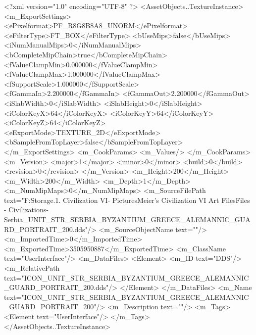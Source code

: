 <?xml version="1.0" encoding="UTF-8" ?>
<AssetObjects..TextureInstance>
	<m_ExportSettings>
		<ePixelformat>PF_R8G8B8A8_UNORM</ePixelformat>
		<eFilterType>FT_BOX</eFilterType>
		<bUseMips>false</bUseMips>
		<iNumManualMips>0</iNumManualMips>
		<bCompleteMipChain>true</bCompleteMipChain>
		<fValueClampMin>0.000000</fValueClampMin>
		<fValueClampMax>1.000000</fValueClampMax>
		<fSupportScale>1.000000</fSupportScale>
		<fGammaIn>2.200000</fGammaIn>
		<fGammaOut>2.200000</fGammaOut>
		<iSlabWidth>0</iSlabWidth>
		<iSlabHeight>0</iSlabHeight>
		<iColorKeyX>64</iColorKeyX>
		<iColorKeyY>64</iColorKeyY>
		<iColorKeyZ>64</iColorKeyZ>
		<eExportMode>TEXTURE_2D</eExportMode>
		<bSampleFromTopLayer>false</bSampleFromTopLayer>
	</m_ExportSettings>
	<m_CookParams>
		<m_Values/>
	</m_CookParams>
	<m_Version>
		<major>1</major>
		<minor>0</minor>
		<build>0</build>
		<revision>0</revision>
	</m_Version>
	<m_Height>200</m_Height>
	<m_Width>200</m_Width>
	<m_Depth>1</m_Depth>
	<m_NumMipMaps>0</m_NumMipMaps>
	<m_SourceFilePath text="F:\Mod Storage\2.1. Civilization VI\Mods\Archive - Pictures\Sid Meier's Civilization VI Art Files\Art Files - Civilizations\Civilization - Serbia\ICON_UNIT_STR_SERBIA_BYZANTIUM_GREECE_ALEMANNIC_GUARD_PORTRAIT_200.dds"/>
	<m_SourceObjectName text=""/>
	<m_ImportedTime>0</m_ImportedTime>
	<m_ExportedTime>3505950887</m_ExportedTime>
	<m_ClassName text="UserInterface"/>
	<m_DataFiles>
		<Element>
			<m_ID text="DDS"/>
			<m_RelativePath text="ICON_UNIT_STR_SERBIA_BYZANTIUM_GREECE_ALEMANNIC_GUARD_PORTRAIT_200.dds"/>
		</Element>
	</m_DataFiles>
	<m_Name text="ICON_UNIT_STR_SERBIA_BYZANTIUM_GREECE_ALEMANNIC_GUARD_PORTRAIT_200"/>
	<m_Description text=""/>
	<m_Tags>
		<Element text="UserInterface"/>
	</m_Tags>
</AssetObjects..TextureInstance>

